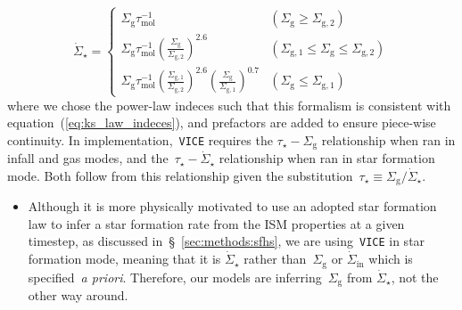 \documentclass[fleqn, usenatbib]{mnras}
\newcommand{\refp}[1]{(\ref{#1})}
\begin{document}
\begin{itemize}
	\begin{equation} 
	\dot{\Sigma}_\star =\begin{cases} 
	\Sigma_\text{g} \tau_\text{mol}^{-1} & (\Sigma_\text{g} \geq 
	\Sigma_{\text{g},2})  
	\\ 
	\Sigma_\text{g} \tau_\text{mol}^{-1} \left(\frac{
		\Sigma_\text{g} 
	}{
		\Sigma_{\text{g},2}
	}\right)^{2.6} & (\Sigma_{\text{g},1} \leq \Sigma_\text{g} \leq 
	\Sigma_{\text{g},2}) 
	\\ 
	\Sigma_\text{g} \tau_\text{mol}^{-1} \left(\frac{
		\Sigma_{\text{g},1} 
	}{
		\Sigma_{\text{g},2} 
	}\right)^{2.6} \left(\frac{
		\Sigma_\text{g} 
	}{
		\Sigma_{\text{g},1} 
	}\right)^{0.7} & (\Sigma_\text{g} \leq \Sigma_{\text{g},1}) 
	\end{cases} 
	\label{eq:ks_law} 
	\end{equation} 
	where we chose the power-law indeces such that this formalism is consistent 
	with equation~\refp{eq:ks_law_indeces}, and prefactors are added to ensure 
	piece-wise continuity. In implementation,~\texttt{VICE} requires the 
	$\tau_\star-\Sigma_\text{g}$ relationship when ran in infall and gas 
	modes, and the~$\tau_\star-\dot{\Sigma}_\star$ relationship when ran in 
	star formation mode. Both follow from this relationship given the 
	substitution~$\tau_\star \equiv \Sigma_\text{g}/\dot{\Sigma}_\star$. 
	\begin{itemize} 
		\item Although it is more physically motivated to use an adopted star 
		formation law to infer a star formation rate from the ISM properties at 
		a given timestep, as discussed in~\S~\ref{sec:methods:sfhs}, we are 
		using~\texttt{VICE} in star formation mode, meaning that it is 
		$\dot{\Sigma}_\star$ rather than~$\Sigma_\text{g}$ or 
		$\dot{\Sigma}_\text{in}$ which is specified~\textit{a priori}. 
		Therefore, our models are inferring~$\Sigma_\text{g}$ from 
		$\dot{\Sigma}_\star$, not the other way around. 
	\end{itemize} 


\end{itemize}
\end{document}
